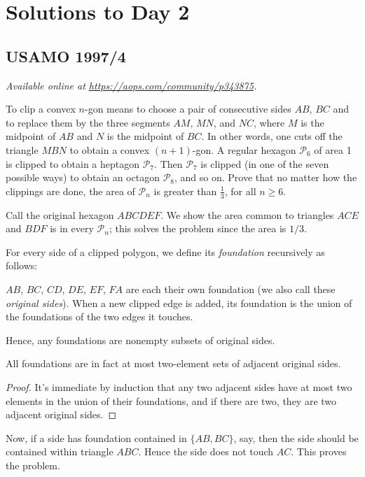 \documentclass[11pt]{scrartcl}
\begin{document}
\section{Solutions to Day 2}
\subsection{USAMO 1997/4}
\textsl{Available online at \url{https://aops.com/community/p343875}.}
\begin{mdframed}[style=mdpurplebox,frametitle={Problem statement}]
To clip a convex $n$-gon means to choose a pair of
consecutive sides $AB$, $BC$ and to replace them
by the three segments $AM$, $MN$, and $NC$,
where $M$ is the midpoint of $AB$ and $N$ is the midpoint of $BC$.
In other words, one cuts off the triangle $MBN$ to obtain a convex $(n+1)$-gon.
A regular hexagon $\mathcal{P}_6$ of area 1 is clipped to obtain a
heptagon $\mathcal{P}_7$.
Then $\mathcal{P}_7$ is clipped (in one of the seven possible ways)
to obtain an octagon $\mathcal{P}_8$, and so on.
Prove that no matter how the clippings are done,
the area of $\mathcal{P}_n$ is greater than $\frac 13$, for all $n \geq 6$.
\end{mdframed}
Call the original hexagon $ABCDEF$.
We show the area common to triangles $ACE$ and $BDF$ is in every
$\mathcal{P}_n$; this solves the problem since the area is $1/3$.

For every side of a clipped polygon,
we define its \emph{foundation} recursively as follows:
\begin{itemize}
  \ii $AB$, $BC$, $CD$, $DE$, $EF$, $FA$
  are each their own foundation
  (we also call these \emph{original sides}).
  \ii When a new clipped edge is added,
  its foundation is the union of the foundations
  of the two edges it touches.
\end{itemize}
Hence, any foundations are nonempty subsets
of original sides.

\begin{claim*}
  All foundations are in fact at most
  two-element sets of adjacent original sides.
\end{claim*}
\begin{proof}
  It's immediate by induction
  that any two adjacent sides have at most two elements
  in the union of their foundations, and if there are two,
  they are two adjacent original sides.
\end{proof}

Now, if a side has foundation contained in $\{AB,BC\}$, say,
then the side should be contained within triangle $ABC$.
Hence the side does not touch $AC$.
This proves the problem.
\pagebreak
\end{document}
